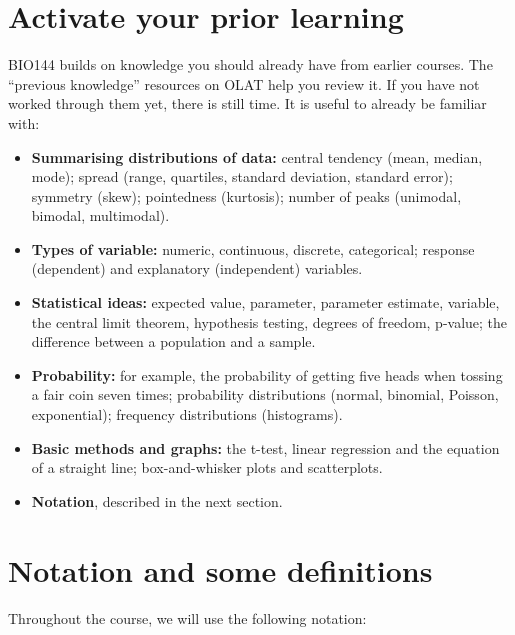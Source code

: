 \documentclass[
  letterpaper,
  8pt,
  a4paper]{book}
\providecommand{\tightlist}{%
  \setlength{\itemsep}{0pt}\setlength{\parskip}{0pt}}
\begin{document}
\section*{Activate your prior
learning}\label{activate-your-prior-learning}


BIO144 builds on knowledge you should already have from earlier courses.
The ``previous knowledge'' resources on OLAT help you review it. If you
have not worked through them yet, there is still time. It is useful to
already be familiar with:

\begin{itemize}
\tightlist
\item
  \textbf{Summarising distributions of data:} central tendency (mean,
  median, mode); spread (range, quartiles, standard deviation, standard
  error); symmetry (skew); pointedness (kurtosis); number of peaks
  (unimodal, bimodal, multimodal).
\item
  \textbf{Types of variable:} numeric, continuous, discrete,
  categorical; response (dependent) and explanatory (independent)
  variables.
\item
  \textbf{Statistical ideas:} expected value, parameter, parameter
  estimate, variable, the central limit theorem, hypothesis testing,
  degrees of freedom, p-value; the difference between a population and a
  sample.
\item
  \textbf{Probability:} for example, the probability of getting five
  heads when tossing a fair coin seven times; probability distributions
  (normal, binomial, Poisson, exponential); frequency distributions
  (histograms).
\item
  \textbf{Basic methods and graphs:} the t-test, linear regression and
  the equation of a straight line; box-and-whisker plots and
  scatterplots.
\item
  \textbf{Notation}, described in the next section.
\end{itemize}

\section*{Notation and some
definitions}\label{notation-and-some-definitions}


Throughout the course, we will use the following notation:
\end{document}
